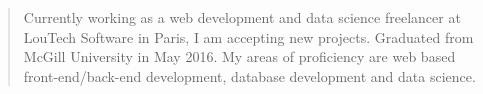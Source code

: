 \begin{quote}
Currently working as a web development and data science freelancer at LouTech Software in Paris, I am accepting new projects. Graduated from McGill University in May 2016.
My areas of proficiency are web based front-end/back-end development, database development and data science.
\end{quote}





\divider\smallskip


\divider\smallskip


\divider\smallskip



\divider\smallskip







\begin{minipage}{0.20\textwidth}
\end{minipage}%
\begin{minipage}{0.22\textwidth}
\end{minipage}%
\begin{minipage}{0.15\textwidth}
\end{minipage}%








